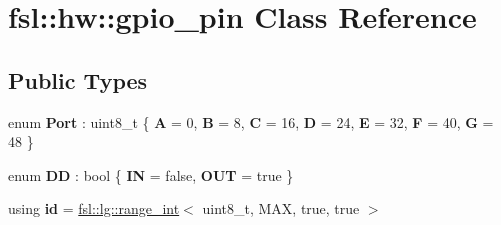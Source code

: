 \hypertarget{classfsl_1_1hw_1_1gpio__pin}{}\section{fsl\+::hw\+::gpio\+\_\+pin Class Reference}
\label{classfsl_1_1hw_1_1gpio__pin}
\subsection*{Public Types}
\begin{DoxyCompactItemize}
\item 
\mbox{\label{classfsl_1_1hw_1_1gpio__pin_ac3d1d12e22eda4b453175b5147662388}} 
enum {\bfseries Port} \+: uint8\+\_\+t \{ \newline
{\bfseries A} = 0, 
{\bfseries B} = 8, 
{\bfseries C} = 16, 
{\bfseries D} = 24, 
\newline
{\bfseries E} = 32, 
{\bfseries F} = 40, 
{\bfseries G} = 48
 \}
\item 
\mbox{\label{classfsl_1_1hw_1_1gpio__pin_ab783e62e4786fa509bfc467af0245845}} 
enum {\bfseries DD} \+: bool \{ {\bfseries IN} = false, 
{\bfseries O\+UT} = true
 \}
\item 
\mbox{\label{classfsl_1_1hw_1_1gpio__pin_a7b630bf402e6adc2f3b612dab8093435}} 
using {\bfseries id} = \mbox{\hyperlink{classfsl_1_1lg_1_1range__int}{fsl\+::lg\+::range\+\_\+int}}$<$ uint8\+\_\+t, M\+AX, true, true $>$
\end{DoxyCompactItemize}
